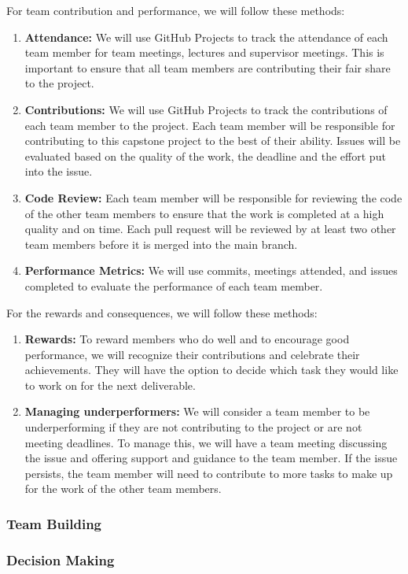 \documentclass{article}
\begin{document}
For team contribution and performance, we will follow these methods:

\begin{enumerate}
  \item \textbf{Attendance:} We will use GitHub Projects to track the attendance of each team member for team meetings, lectures and supervisor meetings. This is important to ensure that all team members are contributing their fair share to the project.
  \item \textbf{Contributions:} We will use GitHub Projects to track the contributions of each team member to the project. Each team member will be responsible for contributing to this capstone project to the best of their ability. Issues will be evaluated based on the quality of the work, the deadline and the effort put into the issue.
  \item \textbf{Code Review:} Each team member will be responsible for reviewing the code of the other team members to ensure that the work is completed at a high quality and on time. Each pull request will be reviewed by at least two other team members before it is merged into the main branch.
  \item \textbf{Performance Metrics:} We will use commits, meetings attended, and issues completed to evaluate the performance of each team member.
\end{enumerate}

For the rewards and consequences, we will follow these methods:

\begin{enumerate}
  \item \textbf{Rewards:} To reward members who do well and to encourage good performance, we will recognize their contributions and celebrate their achievements. They will have the option to decide which task they would like to work on for the next deliverable.
  \item \textbf{Managing underperformers:} We will consider a team member to be underperforming if they are not contributing to the project or are not meeting deadlines. To manage this, we will have a team meeting discussing the issue and offering support and guidance to the team member. If the issue persists, the team member will need to contribute to more tasks to make up for the work of the other team members.
\end{enumerate}


\subsubsection*{Team Building}


\subsubsection*{Decision Making} 

\end{document}
